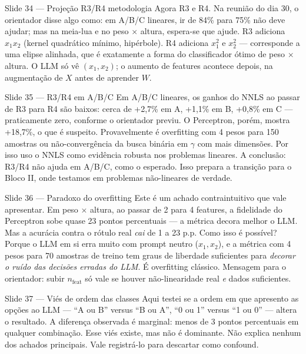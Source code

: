 \documentclass[aspectratio=169,10pt]{beamer}
\begin{document}
\begin{frame}{Slide 34 --- Proje\c{c}\~ao R3/R4 metodologia}
\footnotesize
Agora R3 e R4. Na reuni\~ao do dia 30, o orientador disse algo como: em A/B/C lineares, ir de 84\% para 75\% n\~ao deve ajudar; mas na meia-lua e no peso $\times$ altura, espera-se que ajude. R3 adiciona $x_1 x_2$ (kernel quadr\'atico m\'inimo, hip\'erbole). R4 adiciona $x_1^2$ e $x_2^2$ --- corresponde a uma elipse alinhada, que \'e exatamente a forma do classificador \'otimo de peso $\times$ altura. O LLM s\'o v\^e $(x_1, x_2)$; o aumento de features acontece depois, na augmenta\c{c}\~ao de $X$ antes de aprender $W$.
\end{frame}

\begin{frame}{Slide 35 --- R3/R4 em A/B/C}
\footnotesize
Em A/B/C lineares, os ganhos do NNLS ao passar de R3 para R4 s\~ao baixos: cerca de +2,7\% em A, +1,1\% em B, +0,8\% em C --- praticamente zero, conforme o orientador previu. O Perceptron, por\'em, mostra +18,7\%, o que \'e suspeito. Provavelmente \'e overfitting com 4 pesos para 150 amostras ou n\~ao-converg\^encia da busca bin\'aria em $\gamma$ com mais dimens\~oes. Por isso uso o NNLS como evid\^encia robusta nos problemas lineares. A conclus\~ao: R3/R4 n\~ao ajuda em A/B/C, como o esperado. Isso prepara a transi\c{c}\~ao para o Bloco II, onde testamos em problemas n\~ao-lineares de verdade.
\end{frame}

\begin{frame}{Slide 36 --- Paradoxo do overfitting}
\footnotesize
Este \'e um achado contraintuitivo que vale apresentar. Em peso $\times$ altura, ao passar de 2 para 4 features, a fidelidade do Perceptron sobe quase 23 pontos percentuais --- a m\'etrica decora melhor o LLM. Mas a acur\'acia contra o r\'otulo real \emph{cai} de 1 a 23 p.p. Como isso \'e poss\'ivel? Porque o LLM em si erra muito com prompt neutro ($x_1, x_2$), e a m\'etrica com 4 pesos para 70 amostras de treino tem graus de liberdade suficientes para \emph{decorar o ru\'ido das decis\~oes erradas do LLM}. \'E overfitting cl\'assico. Mensagem para o orientador: subir $n_{\text{feat}}$ s\'o vale se houver n\~ao-linearidade real \emph{e} dados suficientes.
\end{frame}

\begin{frame}{Slide 37 --- Vi\'es de ordem das classes}
\footnotesize
Aqui testei se a ordem em que apresento as op\c{c}\~oes ao LLM --- ``A ou B'' versus ``B ou A'', ``0 ou 1'' versus ``1 ou 0'' --- altera o resultado. A diferen\c{c}a observada \'e marginal: menos de 3 pontos percentuais em qualquer combina\c{c}\~ao. Esse vi\'es existe, mas n\~ao \'e dominante. N\~ao explica nenhum dos achados principais. Vale registr\'a-lo para descartar como confound.
\end{frame}
\end{document}
